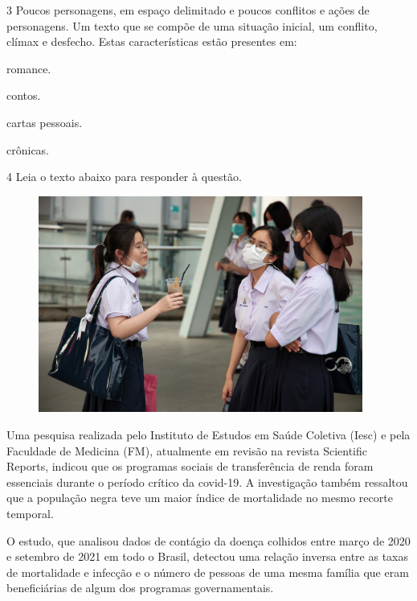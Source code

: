 \pagebreak

\num{3} Poucos personagens, em espaço
delimitado e poucos conflitos e ações de personagens. Um texto que se
compõe de uma situação inicial, um conflito, clímax e desfecho. Estas
características estão presentes em:

\begin{escolha}

    \item romance.

    \item contos.

    \item cartas pessoais.

    \item crônicas. 

\end{escolha}

\num{4} Leia o texto abaixo para responder à questão.

\begin{myquote}

\begin{figure}[H]
\centering
\includegraphics[width=0.95\textwidth]{./imgSAEB_7_POR/media/image67.png}
\end{figure} 

Uma pesquisa realizada pelo Instituto de Estudos em Saúde Coletiva
(Iesc) e pela Faculdade de Medicina (FM), atualmente em revisão na
revista Scientific Reports, indicou que os programas sociais de
transferência de renda foram essenciais durante o período crítico da
covid-19. A investigação também ressaltou que a população negra teve um
maior índice de mortalidade no mesmo recorte temporal.

O estudo, que analisou dados de contágio da doença colhidos entre março
de 2020 e setembro de 2021 em todo o Brasil, detectou uma relação
inversa entre as taxas de mortalidade e infecção e o número de pessoas
de uma mesma família que eram beneficiárias de algum dos programas
governamentais.


\end{myquote}

